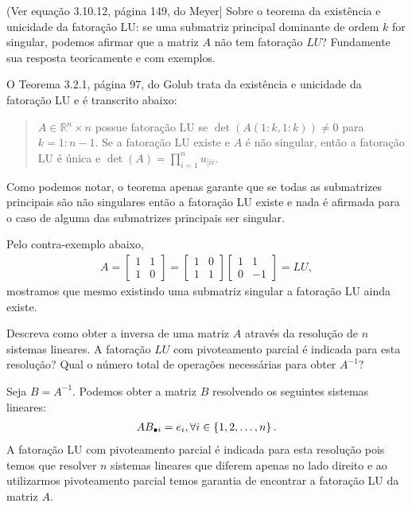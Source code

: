 \begin{questions}
    \question(Ver equa\c{c}\~{a}o 3.10.12, p\'{a}gina 149, do Meyer\nocite{Meyer:2000:matrix}] Sobre o teorema da exist\^{e}ncia e unicidade da fatora\c{c}\~{a}o LU: se uma submatriz principal dominante de ordem $k$ for singular, podemos afirmar que a matriz $A$ n\~{a}o tem fatora\c{c}\~{a}o $LU$? Fundamente sua resposta teoricamente e com exemplos.
    \begin{solution}
        O Teorema 3.2.1, p\'{a}gina 97, do Golub\nocite{Golub:1996:matrix} trata da exist\^{e}ncia e unicidade da fatora\c{c}\~{a}o LU e \'{e} transcrito abaixo:
        \begin{quote}
            $A \in \mathbb{R}{^n \times n}$ possue fatora\c{c}\~{a}o LU se $\det(A(1:k, 1:k)) \neq 0$ para $k = 1:n - 1$. Se a fatora\c{c}\~{a}o LU existe e $A$ \'{e} n\~{a}o singular, ent\~{a}o a fatora\c{c}\~{a}o LU \'{e} \'{u}nica e $\det(A) = \prod_{i = 1}^n u_{[ii}$.
        \end{quote}

        Como podemos notar, o teorema apenas garante que se todas as submatrizes principais s\~{a}o n\~{a}o singulares ent\~{a}o a fatora\c{c}\~{a}o LU existe e nada \'{e} afirmada para o caso de alguma das submatrizes principais ser singular.

        Pelo contra-exemplo abaixo,
        \begin{align*}
            A = \begin{bmatrix}
                1 & 1 \\
                1 & 0
            \end{bmatrix} = \begin{bmatrix}
                1 & 0 \\
                1 & 1
            \end{bmatrix} \begin{bmatrix}
                1 & 1 \\
                0 & -1
            \end{bmatrix} = L U,
        \end{align*}
        mostramos que mesmo existindo uma submatriz singular a fatora\c{c}\~{a}o LU ainda existe.
    \end{solution}

    \question Descreva como obter a inversa de uma matriz $A$ atrav\'{e}s da resolu\c{c}\~{a}o de $n$ sistemas lineares. A fatora\c{c}\~{a}o $LU$ com pivoteamento parcial \'{e} indicada para esta resolu\c{c}\~{a}o? Qual o número total de opera\c{c}\~{o}es necess\'{a}rias para obter $A^{-1}$?
    \begin{solution}
        Seja $B = A^{-1}$. Podemos obter a matriz $B$ resolvendo os seguintes sistemas lineares:
        \begin{align*}
            A B_{\bullet i} = e_i, \forall i \in \left\{ 1, 2, \ldots, n \right\}.
        \end{align*}
        A fatora\c{c}\~{a}o LU com pivoteamento parcial \'{e} indicada para esta resolu\c{c}\~{a}o pois temos que resolver $n$ sistemas lineares que diferem apenas no lado direito e ao utilizarmos pivoteamento parcial temos garantia de encontrar a fatora\c{c}\~{a}o LU da matriz $A$.


\end{solution}
\end{questions}
